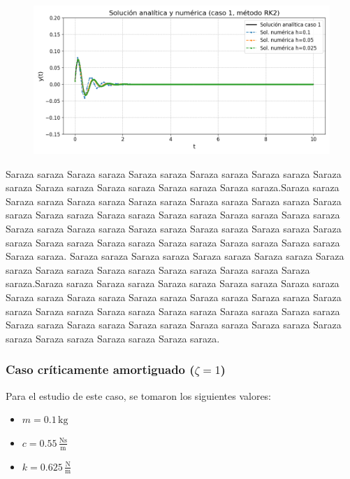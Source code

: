 \documentclass[titlepage,a4paper]{article}
\begin{document}
\begin{figure}[H]
  \centering
  \includegraphics[width=\textwidth]{resultados/comparacion_analitica_aproximada/RK2/z=0.25/caso 1_2.png}
  \label{fig:euler_subamortiguado}
\end{figure}

Saraza saraza Saraza saraza Saraza saraza Saraza saraza Saraza saraza Saraza saraza Saraza saraza Saraza saraza Saraza saraza Saraza saraza.Saraza saraza Saraza saraza Saraza saraza Saraza saraza Saraza saraza Saraza saraza Saraza saraza Saraza saraza Saraza saraza Saraza saraza Saraza saraza Saraza saraza Saraza saraza Saraza saraza Saraza saraza Saraza saraza Saraza saraza Saraza saraza Saraza saraza Saraza saraza Saraza saraza Saraza saraza Saraza saraza Saraza saraza. Saraza saraza Saraza saraza Saraza saraza Saraza saraza Saraza saraza Saraza saraza Saraza saraza Saraza saraza Saraza saraza Saraza saraza.Saraza saraza Saraza saraza Saraza saraza Saraza saraza Saraza saraza Saraza saraza Saraza saraza Saraza saraza Saraza saraza Saraza saraza Saraza saraza Saraza saraza Saraza saraza Saraza saraza Saraza saraza Saraza saraza Saraza saraza Saraza saraza Saraza saraza Saraza saraza Saraza saraza Saraza saraza Saraza saraza Saraza saraza Saraza saraza.



\subsubsection{Caso críticamente amortiguado ($\zeta = 1$)}

Para el estudio de este caso, se tomaron los siguientes valores:

\begin{itemize}
    \item $m = 0.1\,\text{kg}$
    \item $c = 0.55\,\frac{\text{Ns}}{\text{m}}$
    \item $k = 0.625\,\frac{\text{N}}{\text{m}}$
\end{itemize}
\end{document}
